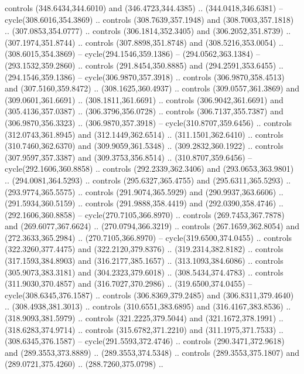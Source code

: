 \begin{scope}[cm={{1.25,0.0,0.0,-1.25,(0.0,743.43331)}}]
    controls (348.6434,344.6010) and (346.4723,344.4385) .. (344.0418,346.6381) --
    cycle(308.6016,354.3869) .. controls (308.7639,357.1948) and
    (308.7003,357.1818) .. (307.0853,354.0777) .. controls (306.1814,352.3405) and
    (306.2052,351.8739) .. (307.1974,351.8744) .. controls (307.8898,351.8748) and
    (308.5216,353.0054) .. (308.6015,354.3869) -- cycle(294.1546,359.1386) --
    (294.0562,363.1384) -- (293.1532,359.2860) .. controls (291.8454,350.8885) and
    (294.2591,353.6455) .. (294.1546,359.1386) -- cycle(306.9870,357.3918) ..
    controls (306.9870,358.4513) and (307.5160,359.8472) .. (308.1625,360.4937) ..
    controls (309.0557,361.3869) and (309.0601,361.6691) .. (308.1811,361.6691) ..
    controls (306.9042,361.6691) and (305.4136,357.0387) .. (306.3796,356.0728) ..
    controls (306.7137,355.7387) and (306.9870,356.3323) .. (306.9870,357.3918) --
    cycle(310.8707,359.6456) .. controls (312.0743,361.8945) and
    (312.1449,362.6514) .. (311.1501,362.6410) .. controls (310.7460,362.6370) and
    (309.9059,361.5348) .. (309.2832,360.1922) .. controls (307.9597,357.3387) and
    (309.3753,356.8514) .. (310.8707,359.6456) -- cycle(292.1606,360.8858) ..
    controls (292.2339,362.3406) and (293.0653,363.9801) .. (294.0081,364.5293) ..
    controls (295.6327,365.4755) and (295.6311,365.5293) .. (293.9774,365.5575) ..
    controls (291.9074,365.5929) and (290.9937,363.6606) .. (291.5934,360.5159) ..
    controls (291.9888,358.4419) and (292.0390,358.4746) .. (292.1606,360.8858) --
    cycle(270.7105,366.8970) .. controls (269.7453,367.7878) and
    (269.6077,367.6624) .. (270.0794,366.3219) .. controls (267.1659,362.8054) and
    (272.3633,365.2984) .. (270.7105,366.8970) -- cycle(319.6500,374.0455) ..
    controls (322.3260,377.4475) and (322.2120,379.8376) .. (319.2314,382.8182) ..
    controls (317.1593,384.8903) and (316.2177,385.1657) .. (313.1093,384.6086) ..
    controls (305.9073,383.3181) and (304.2323,379.6018) .. (308.5434,374.4783) ..
    controls (311.9030,370.4857) and (316.7027,370.2986) .. (319.6500,374.0455) --
    cycle(308.6345,376.1587) .. controls (306.8369,379.2485) and
    (306.8311,379.4640) .. (308.4938,381.3013) .. controls (310.6551,383.6895) and
    (316.4167,383.8536) .. (318.9093,381.5979) .. controls (321.2225,379.5044) and
    (321.1672,378.1991) .. (318.6283,374.9714) .. controls (315.6782,371.2210) and
    (311.1975,371.7533) .. (308.6345,376.1587) -- cycle(291.5593,372.4746) ..
    controls (290.3471,372.9618) and (289.3553,373.8889) .. (289.3553,374.5348) ..
    controls (289.3553,375.1807) and (289.0721,375.4260) .. (288.7260,375.0798) ..

\end{scope}
